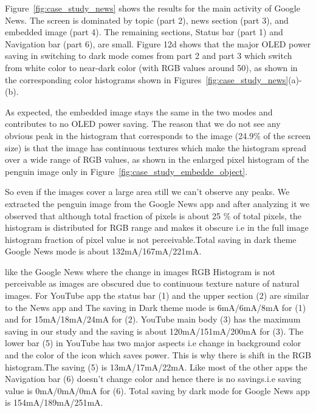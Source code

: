Figure~\ref{fig:case_study_news} shows the results
for the main activity of Google News.  The screen is dominated by
topic (part 2), news section (part 3), and embedded image (part 4).
The remaining sections, Status bar (part 1) and Navigation bar (part
6), are small.
Figure 12d shows that the major OLED power saving in switching to dark mode comes from
part 2 and part 3 which switch from white color to near-dark color
(with RGB values around 50), as shown
in the corresponding color histograms shown
in Figures~\ref{fig:case_study_news}(a)-(b).

As expected, the embedded image stays the same
in the two modes and contributes to no OLED power saving. 
The reason that we do not see any obvious peak in the histogram that corresponds to
the image (24.9\% of the screen size) is that 
the image has continuous textures which make the histogram spread over
a wide range of RGB values, as shown in the enlarged pixel histogram of
the penguin image only in Figure~\ref{fig:case_study_embedde_object}.

So even if the images cover a large area still we
can't observe any peaks. We extracted the penguin image from the Google News
app and  after analyzing it we observed that although total fraction of pixels
is about 25 \% of total pixels, the histogram is distributed for RGB range and
makes it obscure i.e in the full image histogram fraction of pixel value is not
perceivable.Total saving in dark theme Google News mode is about 132mA/167mA/221mA.
\fi


like the Google News where the change in images RGB Histogram is not
perceivable as images are obscured due to continuous texture nature of
natural images. For YouTube app the status bar (1) and the upper section (2)
are similar to the News app and The saving in Dark theme mode is
6mA/6mA/8mA for (1) and for 15mA/18mA/24mA for (2). YouTube main body (3) has
the maximum saving in our study and the saving is about 120mA/151mA/200mA for (3).
The lower bar (5) in YouTube has two major aspects i.e change in background
color and the color of the icon which saves power. This is why there is shift
in the RGB histogram.The saving (5) is  13mA/17mA/22mA. Like most of the other
apps the Navigation bar (6) doesn't change color and hence there is no
savings.i.e saving value is 0mA/0mA/0mA for (6).
Total saving by dark mode for Google News app is 154mA/189mA/251mA.
\fi

% 


